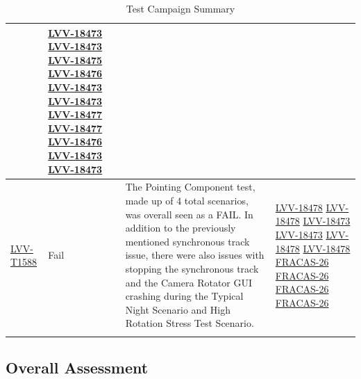 \documentclass[SE,STR,toc]{lsstdoc}
\begin{document}
\begin{longtable}{p{2cm}p{2.5cm}p{9cm}p{2.5cm}}
\begin{minipage}[]{9cm}
    \medskip
    \end{minipage}
    &
          \href{https://jira.lsstcorp.org/browse/LVV-18473}{LVV-18473}
          \href{https://jira.lsstcorp.org/browse/LVV-18473}{LVV-18473}
          \href{https://jira.lsstcorp.org/browse/LVV-18475}{LVV-18475}
          \href{https://jira.lsstcorp.org/browse/LVV-18476}{LVV-18476}
          \href{https://jira.lsstcorp.org/browse/LVV-18473}{LVV-18473}
          \href{https://jira.lsstcorp.org/browse/LVV-18473}{LVV-18473}
          \href{https://jira.lsstcorp.org/browse/LVV-18477}{LVV-18477}
          \href{https://jira.lsstcorp.org/browse/LVV-18477}{LVV-18477}
          \href{https://jira.lsstcorp.org/browse/LVV-18476}{LVV-18476}
          \href{https://jira.lsstcorp.org/browse/LVV-18473}{LVV-18473}
          \href{https://jira.lsstcorp.org/browse/LVV-18473}{LVV-18473}
    \\\hline
    \href{https://jira.lsstcorp.org/secure/Tests.jspa#/testCase/LVV-T1588}{LVV-T1588}
    & Fail &
    \begin{minipage}[]{9cm}
    \smallskip
     The Pointing Component test, made up of 4 total scenarios, was overall
seen as a FAIL. In addition to the previously mentioned synchronous
track issue, there were also issues with stopping the synchronous track
and the Camera Rotator GUI crashing during the Typical Night Scenario
and High Rotation Stress Test Scenario.

    \medskip
    \end{minipage}
    &
          \href{https://jira.lsstcorp.org/browse/LVV-18478}{LVV-18478}
          \href{https://jira.lsstcorp.org/browse/LVV-18478}{LVV-18478}
          \href{https://jira.lsstcorp.org/browse/LVV-18473}{LVV-18473}
          \href{https://jira.lsstcorp.org/browse/LVV-18473}{LVV-18473}
          \href{https://jira.lsstcorp.org/browse/LVV-18478}{LVV-18478}
          \href{https://jira.lsstcorp.org/browse/LVV-18478}{LVV-18478}
          \href{https://jira.lsstcorp.org/browse/FRACAS-26}{FRACAS-26}
          \href{https://jira.lsstcorp.org/browse/FRACAS-26}{FRACAS-26}
          \href{https://jira.lsstcorp.org/browse/FRACAS-26}{FRACAS-26}
          \href{https://jira.lsstcorp.org/browse/FRACAS-26}{FRACAS-26}
    \\\hline
\caption{Test Campaign Summary}
\label{table:summary}
\end{longtable}

\subsection{Overall Assessment}
\label{sect:overallassessment}
\end{document}
